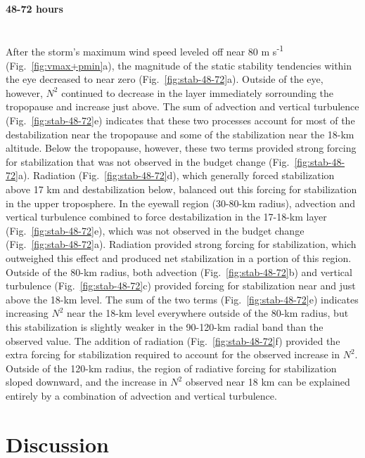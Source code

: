 \paragraph{48-72 hours}\mbox{}\\
\indent After the storm's maximum wind speed leveled off near 80 m s\textsuperscript{-1} (Fig.~\ref{fig:vmax+pmin}a), the magnitude of the static stability tendencies within the eye decreased to near zero (Fig.~\ref{fig:stab-48-72}a).
Outside of the eye, however, $N^2$ continued to decrease in the layer immediately sorrounding the tropopause and increase just above.
The sum of advection and vertical turbulence (Fig.~\ref{fig:stab-48-72}e) indicates that these two processes account for most of the destabilization near the tropopause and some of the stabilization near the 18-km altitude.
Below the tropopause, however, these two terms provided strong forcing for stabilization that was not observed in the budget change (Fig.~\ref{fig:stab-48-72}a).
Radiation (Fig.~\ref{fig:stab-48-72}d), which generally forced stabilization above 17 km and destabilization below, balanced out this forcing for stabilization in the upper troposphere.
In the eyewall region (30-80-km radius), advection and vertical turbulence combined to force destabilization in the 17-18-km layer (Fig.~\ref{fig:stab-48-72}e), which was not observed in the budget change (Fig.~\ref{fig:stab-48-72}a).
Radiation provided strong forcing for stabilization, which outweighed this effect and produced net stabilization in a portion of this region.
Outside of the 80-km radius, both advection (Fig.~\ref{fig:stab-48-72}b) and vertical turbulence (Fig.~\ref{fig:stab-48-72}c) provided forcing for stabilization near and just above the 18-km level.
The sum of the two terms (Fig.~\ref{fig:stab-48-72}e) indicates increasing $N^2$ near the 18-km level everywhere outside of the 80-km radius, but this stabilization is slightly weaker in the 90-120-km radial band than the observed value.
The addition of radiation (Fig.~\ref{fig:stab-48-72}f) provided the extra forcing for stabilization required to account for the observed increase in $N^2$.
Outside of the 120-km radius, the region of radiative forcing for stabilization sloped downward, and the increase in $N^2$ observed near 18 km can be explained entirely by a combination of advection and vertical turbulence.

\section{Discussion}
